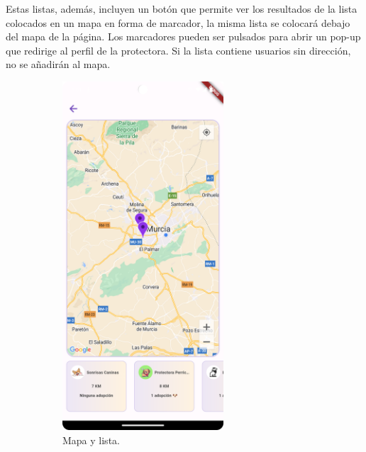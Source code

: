 \documentclass[a4paper, 12pt]{article}
\begin{document}
Estas listas, además, incluyen un botón que permite ver los resultados de la lista colocados en un mapa en forma de marcador, la misma lista se colocará debajo del mapa de la página. Los marcadores pueden ser pulsados para abrir un pop-up que redirige al perfil de la protectora. Si la lista contiene usuarios sin dirección, no se añadirán al mapa.

\begin{figure}[H]
   	\begin{subfigure}{0.48\textwidth}
		\begin{center}
			{\includegraphics[width=6cm]{app/MapsPage.png}\par}
			\caption{Mapa y lista.}
		\end{center}  
	\end{subfigure}\hfill
   	\begin{subfigure}{0.48\textwidth}
		\begin{center}

\end{center}
\end{subfigure}
\end{figure}
\end{document}
